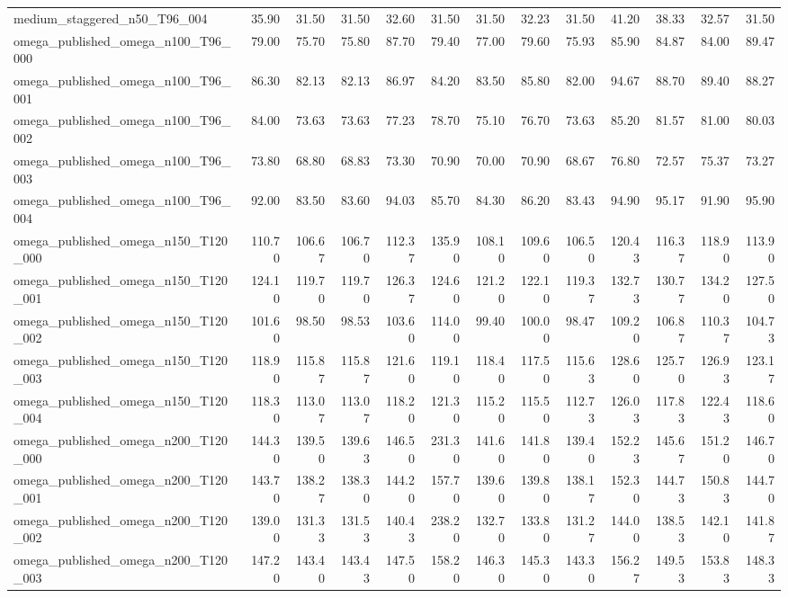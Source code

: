 \begin{table}[htbp]
\begin{tabular}{lrrrrrrrrrrrr}
medium\_staggered\_n50\_T96\_004 & 35.90 & 31.50 & 31.50 & 32.60 & 31.50 & 31.50 & 32.23 & 31.50 & 41.20 & 38.33 & 32.57 & 31.50 \\
omega\_published\_omega\_n100\_T96\_000 & 79.00 & 75.70 & 75.80 & 87.70 & 79.40 & 77.00 & 79.60 & 75.93 & 85.90 & 84.87 & 84.00 & 89.47 \\
omega\_published\_omega\_n100\_T96\_001 & 86.30 & 82.13 & 82.13 & 86.97 & 84.20 & 83.50 & 85.80 & 82.00 & 94.67 & 88.70 & 89.40 & 88.27 \\
omega\_published\_omega\_n100\_T96\_002 & 84.00 & 73.63 & 73.63 & 77.23 & 78.70 & 75.10 & 76.70 & 73.63 & 85.20 & 81.57 & 81.00 & 80.03 \\
omega\_published\_omega\_n100\_T96\_003 & 73.80 & 68.80 & 68.83 & 73.30 & 70.90 & 70.00 & 70.90 & 68.67 & 76.80 & 72.57 & 75.37 & 73.27 \\
omega\_published\_omega\_n100\_T96\_004 & 92.00 & 83.50 & 83.60 & 94.03 & 85.70 & 84.30 & 86.20 & 83.43 & 94.90 & 95.17 & 91.90 & 95.90 \\
omega\_published\_omega\_n150\_T120\_000 & 110.70 & 106.67 & 106.70 & 112.37 & 135.90 & 108.10 & 109.60 & 106.50 & 120.43 & 116.37 & 118.90 & 113.90 \\
omega\_published\_omega\_n150\_T120\_001 & 124.10 & 119.70 & 119.70 & 126.37 & 124.60 & 121.20 & 122.10 & 119.37 & 132.73 & 130.77 & 134.20 & 127.50 \\
omega\_published\_omega\_n150\_T120\_002 & 101.60 & 98.50 & 98.53 & 103.60 & 114.00 & 99.40 & 100.00 & 98.47 & 109.20 & 106.87 & 110.37 & 104.73 \\
omega\_published\_omega\_n150\_T120\_003 & 118.90 & 115.87 & 115.87 & 121.60 & 119.10 & 118.40 & 117.50 & 115.63 & 128.60 & 125.70 & 126.93 & 123.17 \\
omega\_published\_omega\_n150\_T120\_004 & 118.30 & 113.07 & 113.07 & 118.20 & 121.30 & 115.20 & 115.50 & 112.73 & 126.03 & 117.83 & 122.43 & 118.60 \\
omega\_published\_omega\_n200\_T120\_000 & 144.30 & 139.50 & 139.63 & 146.50 & 231.30 & 141.60 & 141.80 & 139.40 & 152.23 & 145.67 & 151.20 & 146.70 \\
omega\_published\_omega\_n200\_T120\_001 & 143.70 & 138.27 & 138.30 & 144.20 & 157.70 & 139.60 & 139.80 & 138.17 & 152.30 & 144.73 & 150.83 & 144.70 \\
omega\_published\_omega\_n200\_T120\_002 & 139.00 & 131.33 & 131.53 & 140.43 & 238.20 & 132.70 & 133.80 & 131.27 & 144.00 & 138.53 & 142.10 & 141.87 \\
omega\_published\_omega\_n200\_T120\_003 & 147.20 & 143.40 & 143.43 & 147.50 & 158.20 & 146.30 & 145.30 & 143.30 & 156.27 & 149.53 & 153.83 & 148.33 \\

\end{tabular}
\end{table}
